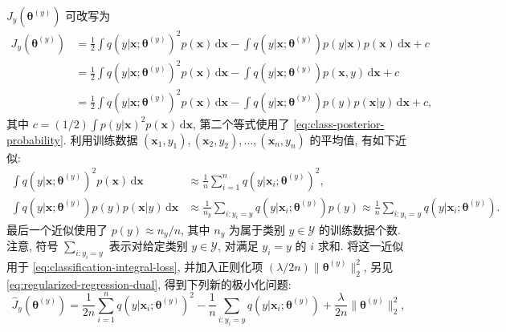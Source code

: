 {$J_y(\boldsymbol{\theta}^{(y)})$ 可改写为}
\begin{equation}\label{eq:classification-integral-loss}
\begin{aligned}
J_y(\boldsymbol{\theta}^{(y)})&=\frac12\int q(y|\boldsymbol{x};\boldsymbol{\theta}^{(y)})^2p(\boldsymbol{x})\,\mathrm d\boldsymbol{x}-\int q(y|\boldsymbol{x};\boldsymbol{\theta}^{(y)})p(y|\boldsymbol{x})p(\boldsymbol{x})\,\mathrm d\boldsymbol{x}+c\\
&=\frac12\int q(y|\boldsymbol{x};\boldsymbol{\theta}^{(y)})^2p(\boldsymbol{x})\,\mathrm d\boldsymbol{x}-\int q(y|\boldsymbol{x};\boldsymbol{\theta}^{(y)})p(\boldsymbol{x},y)\,\mathrm d\boldsymbol{x}+c\\
&=\frac12\int q(y|\boldsymbol{x};\boldsymbol{\theta}^{(y)})^2p(\boldsymbol{x})\,\mathrm d\boldsymbol{x}-\int q(y|\boldsymbol{x};\boldsymbol{\theta}^{(y)})p(y)p(\boldsymbol{x}|y)\,\mathrm d\boldsymbol{x}+c,
\end{aligned}
\end{equation}
{其中 $c=(1/2)\int p(y|\boldsymbol{x})^2p(\boldsymbol{x})\,\mathrm d\boldsymbol{x}$, 第二个等式使用了 \eqref{eq:class-posterior-probability}. 利用训练数据 \linebreak[4]$(\boldsymbol{x}_1,y_1),(\boldsymbol{x}_2,y_2),\ldots,(\boldsymbol{x}_n,y_n)$ 的平均值, 有如下近似:}
\[\begin{aligned}
\int q(y|\boldsymbol{x};\boldsymbol{\theta}^{(y)})^2p(\boldsymbol{x})\,\mathrm d\boldsymbol{x}&\approx\frac1n\sum_{i=1}^nq(y|\boldsymbol{x}_i;\boldsymbol{\theta}^{(y)})^2,\\
\int q(y|\boldsymbol{x};\boldsymbol{\theta}^{(y)})p(y)p(\boldsymbol{x}|y)\,\mathrm d\boldsymbol{x}&\approx\frac1{n_y}\sum_{i:y_i=y}q(y|\boldsymbol{x}_i;\boldsymbol{\theta}^{(y)})p(y)\approx\frac1n\sum_{i:y_i=y}q(y|\boldsymbol{x}_i;\boldsymbol{\theta}^{(y)}).
\end{aligned}\]
{最后一个近似使用了 $p(y)\approx n_y/n$, 其中 $n_y$ 为属于类别 $y\in\mathcal{Y}$ 的训练数据个数. 注意, 符号 $\sum_{i:y_i=y}$ 表示对给定类别 $y\in\mathcal{Y}$, 对满足 $y_i=y$ 的 $i$ 求和. 将这一近似用于 \eqref{eq:classification-integral-loss}, 并加入正则化项 $(\lambda/2n)\|\boldsymbol{\theta}^{(y)}\|_2^2$, 另见 \eqref{eq:regularized-regression-dual}, 得到下列新的极小化问题:}
\begin{equation}\label{eq:classification-empirical-loss}
\widehat J_y(\boldsymbol{\theta}^{(y)})=\frac1{2n}\sum_{i=1}^nq(y|\boldsymbol{x}_i;\boldsymbol{\theta}^{(y)})^2-\frac1n\sum_{i:y_i=y}q(y|\boldsymbol{x}_i;\boldsymbol{\theta}^{(y)})+\frac\lambda{2n}\|\boldsymbol{\theta}^{(y)}\|_2^2,
\end{equation}
